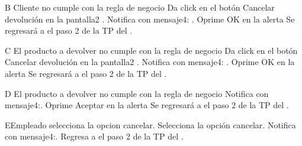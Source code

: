 \begin{UCtrayectoriaA}{B}{ Cliente no cumple con la regla de negocio   }
	\UCpaso [\UCactor] Da click en el botón Cancelar devolución en la pantalla2 . 
	\UCpaso [\UCsist] Notifica con mensaje4: .
	\UCpaso [\UCactor] Oprime OK en la alerta 
	\UCpaso [\UCsist] Se regresará a el paso 2 de la TP del .
\end{UCtrayectoriaA}
\begin{UCtrayectoriaA}{C}{ El producto a devolver no cumple con la regla de negocio   }
	\UCpaso [\UCactor] Da click en el botón Cancelar devolución en la pantalla2 . 
	\UCpaso [\UCsist] Notifica con mensaje4: .
	\UCpaso [\UCactor] Oprime OK en la alerta 
	\UCpaso [\UCsist] Se regresará a el paso 2 de la TP del .
\end{UCtrayectoriaA}
\begin{UCtrayectoriaA}{D}{ El producto a devolver no cumple con la regla de negocio  }
	\UCpaso [\UCsist] Notifica con mensaje4:.
	\UCpaso [\UCactor] Oprime Aceptar en la alerta 
	\UCpaso [\UCsist] Se regresará a el paso 2 de la TP del .
\end{UCtrayectoriaA}
\begin{UCtrayectoriaA}{E}{Empleado selecciona la opcion cancelar.}
	\UCpaso [\UCactor] Selecciona la opción cancelar.
	\UCpaso [\UCsist] Notifica con mensaje4:.
	\UCpaso [\UCsist] Regresa a el paso 2 de la TP del .

\end{UCtrayectoriaA}